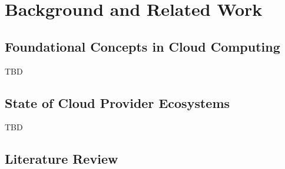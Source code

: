 
\chapter{Background and Related Work} %
\label{chap:Background and Related Work}

\section{Foundational Concepts in Cloud Computing} %
\label{sec:Foundational Concepts in Cloud Computing}

TBD


\section{State of Cloud Provider Ecosystems} %
\label{sec:State of Cloud Provider Ecosystems}

TBD


\section{Literature Review} %
\label{sec:Literature Review}





